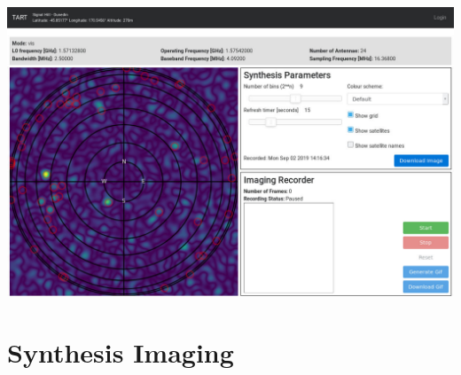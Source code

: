 \documentclass[ignorenonframetext]{beamer}
\begin{document}
\begin{frame}
 \includegraphics[width=\linewidth]{fig/browser_view.jpg}
\end{frame}

\section{Synthesis Imaging}
\end{document}
